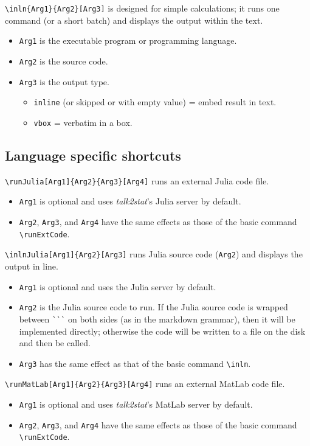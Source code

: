 \documentclass{ltxdoc}
\begin{document}
\bigskip
\noindent \verb|\inln{Arg1}{Arg2}[Arg3]| is designed for simple calculations; it runs one command (or a short batch) and displays the output within the text. 
\begin{itemize}
\item \texttt{Arg1} is the executable program or programming language. 
\item \texttt{Arg2} is the source code. 
\item \texttt{Arg3} is the output type.
\begin{itemize}
\item \texttt{inline} (or skipped or with empty value) = embed result in text.
\item \texttt{vbox} = verbatim in a box.
\end{itemize}
\end{itemize}

\subsection{Language specific shortcuts}
\verb|\runJulia[Arg1]{Arg2}{Arg3}[Arg4]| runs an external Julia code file.
\begin{itemize}
\item \texttt{Arg1} is optional and uses \textit{talk2stat}'s Julia server by default.
\item \texttt{Arg2}, \texttt{Arg3}, and \texttt{Arg4} have the same effects as those of the basic command \verb|\runExtCode|. 
\end{itemize}

\noindent \verb|\inlnJulia[Arg1]{Arg2}[Arg3]| runs Julia source code (\texttt{Arg2}) and displays the output in line.
\begin{itemize}
\item \texttt{Arg1} is optional and uses the Julia server by default.
\item \texttt{Arg2} is the Julia source code to run. If the Julia source code is wrapped between \verb|```|  on both sides (as in the markdown grammar), then it will be implemented directly; otherwise the code will be written to a file on the disk and then be called.
\item \texttt{Arg3} has the same effect as that of the basic command \verb|\inln|.
\end{itemize}

\bigskip
\noindent \verb|\runMatLab[Arg1]{Arg2}{Arg3}[Arg4]| runs an external MatLab code file.
\begin{itemize}
\item \texttt{Arg1} is optional and uses \textit{talk2stat}'s MatLab server by default.
\item \texttt{Arg2}, \texttt{Arg3}, and \texttt{Arg4} have the same effects as those of the basic command \verb|\runExtCode|. 
\end{itemize}
\end{document}
